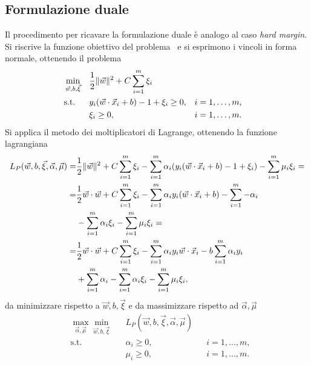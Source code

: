 \subsection{Formulazione duale}\label{subsec:soft_margin_dual}
Il procedimento per ricavare la formulazione duale è analogo al caso \emph{hard margin}.
Si riscrive la funzione obiettivo del problema~ e si esprimono i vincoli in forma normale, ottenendo il problema
\begin{equation}
\label{eq:svc:softmargin:primal_convenient}
\begin{aligned}
& \min_{\Vec{w},b,\Vec{\xi}}    && \frac{1}{2}\|\Vec{w}\|^2 + C\sum_{i=1}^{m} \xi_i \\
& \textrm{s.t.} && y_i(\Vec{w}\cdot \Vec{x}_i + b) - 1 + \xi_i \geq 0, && i=1,\dots,m, \\
&               && \xi_i \geq 0,  && i=1,\dots,m.
\end{aligned}
\end{equation}
%
Si applica il metodo dei moltiplicatori di Lagrange, ottenendo la funzione lagrangiana
\begin{equation}
\label{eq:svc:softmargin:lagrange_fn}
\begin{split}
L_P(\Vec{w},b, \Vec{\xi}, \Vec{\alpha}, \Vec{\mu}) = & \frac{1}{2}\|\Vec{w}\|^2 + C\sum_{i=1}^{m} \xi_i - \sum_{i=1}^{m} \alpha_i (y_i(\Vec{w}\cdot \Vec{x}_i +b) -1 +\xi_i) - \sum_{i=1}^{m}\mu_i\xi_i =\\
        = & \frac{1}{2}\Vec{w}\cdot\Vec{w} + C\sum_{i=1}^{m} \xi_i - \sum_{i=1}^{m} \alpha_i y_i(\Vec{w}\cdot \Vec{x}_i +b) -  \sum_{i=1}^{m} - \alpha_i  \\ & - \sum_{i=1}^{m} \alpha_i\xi_i - \sum_{i=1}^{m}\mu_i\xi_i= \\
        = & \frac{1}{2}\Vec{w}\cdot\Vec{w} + C\sum_{i=1}^{m} \xi_i - \sum_{i=1}^{m} \alpha_i y_i \Vec{w}\cdot \Vec{x}_i - b \sum_{i=1}^{m} \alpha_i y_i \\ & + \sum_{i=1}^{m} \alpha_i - \sum_{i=1}^{m} \alpha_i\xi_i - \sum_{i=1}^{m}\mu_i\xi_i,
\end{split}
\end{equation}
da minimizzare rispetto a $\Vec{w},b,\Vec{\xi}$ e da massimizzare rispetto ad $\Vec{\alpha}, \Vec{\mu}$ 
\begin{equation}
\label{eq:svc:softmargin:max_min}
\begin{aligned}
& \max_{\Vec{\alpha}, \Vec{\mu}} \min_{\Vec{w}, b, \Vec{\xi}} && L_P(\Vec{w},b, \Vec{\xi}, \Vec{\alpha}, \Vec{\mu}) \\
& \textrm{s.t.} && \alpha_i \geq 0,  && i=1,..., m,\\
&               && \mu_i \geq 0,     && i=1,..., m.\\
\end{aligned}
\end{equation}
